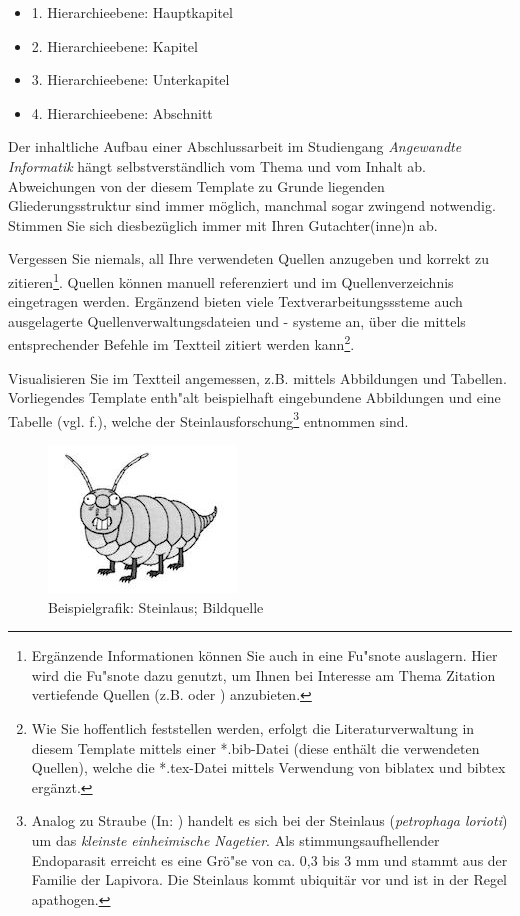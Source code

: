 \documentclass[oneside,bibliography=totocnumbered,BCOR=5mm]{scrbook}%
\theoremstyle{definition}
\theoremstyle{definition}
\theoremstyle{definition}
\theoremstyle{definition}
\theoremstyle{definition}
\theoremstyle{definition}
\begin{document}
\begin{itemize}
\item 1. Hierarchieebene: Hauptkapitel
\item 2. Hierarchieebene: Kapitel
\item 3. Hierarchieebene: Unterkapitel
\item 4. Hierarchieebene: Abschnitt
\end{itemize}

Der inhaltliche Aufbau einer Abschlussarbeit im Studiengang \textit{Angewandte Informatik} h\"angt selbstverst\"andlich vom Thema und vom Inhalt ab. Abweichungen von der diesem Template zu Grunde liegenden Gliederungsstruktur sind immer m\"oglich, manchmal sogar zwingend notwendig. Stimmen Sie sich diesbez\"uglich immer mit Ihren Gutachter(inne)n ab.


Vergessen Sie niemals, all Ihre verwendeten Quellen anzugeben und korrekt zu zitieren\footnote{Erg\"anzende Informationen k\"onnen Sie auch in eine Fu"snote auslagern. Hier wird die Fu"snote dazu genutzt, um Ihnen bei Interesse am Thema Zitation vertiefende Quellen (z.B. \autocite{balzert2011} oder \autocite{franck2013}) anzubieten.}. Quellen k\"onnen manuell referenziert und im Quellenverzeichnis eingetragen werden. Erg\"anzend bieten viele Textverarbeitungsssteme auch ausgelagerte Quellenverwaltungsdateien und - systeme an,  \"uber die mittels entsprechender Befehle im Textteil zitiert werden kann\footnote{Wie Sie hoffentlich feststellen werden, erfolgt die Literaturverwaltung in diesem Template mittels einer *.bib-Datei (diese enth\"alt die verwendeten Quellen), welche die *.tex-Datei mittels Verwendung von biblatex und bibtex erg\"anzt.}.

Visualisieren Sie im Textteil angemessen, z.B. mittels Abbildungen und Tabellen. Vorliegendes Template enth"alt beispielhaft eingebundene Abbildungen und eine Tabelle (vgl. f.), welche der Steinlausforschung\footnote{Analog zu Straube (In: \autocite{pschy}) handelt es sich bei der Steinlaus (\textit{petrophaga lorioti}) um das \frqq \textit{kleinste einheimische Nagetier}\flqq. Als stimmungsaufhellender Endoparasit erreicht es eine Gr\"o"se von ca. 0,3 bis 3 mm und stammt aus der Familie der Lapivora. Die Steinlaus kommt ubiquit\"ar vor und ist in der Regel apathogen.} entnommen sind.


\begin{figure}
\centering
\includegraphics{steinlaus.jpg}
  \caption{Beispielgrafik: Steinlaus; Bildquelle \autocite{loriot}}
\end{figure}
\end{document}
